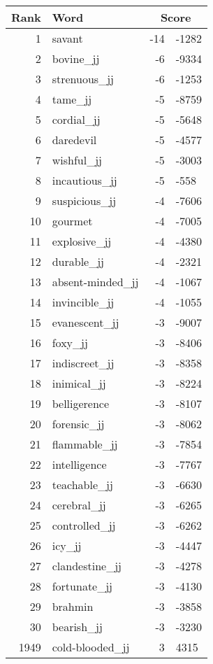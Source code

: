 \begin{longtable}[!htbp]{| rlr@{.}l |}
    \hline
    \textbf{Rank} & \textbf{Word} & \multicolumn{2}{c|}{\textbf{Score}} \\
    \hline
    \endhead
    1 & savant & -14 & -1282 \\
    2 & bovine\_jj & -6 & -9334 \\
    3 & strenuous\_jj & -6 & -1253 \\
    4 & tame\_jj & -5 & -8759 \\
    5 & cordial\_jj & -5 & -5648 \\
    6 & daredevil & -5 & -4577 \\
    7 & wishful\_jj & -5 & -3003 \\
    8 & incautious\_jj & -5 & -558 \\
    9 & suspicious\_jj & -4 & -7606 \\
    10 & gourmet & -4 & -7005 \\
    11 & explosive\_jj & -4 & -4380 \\
    12 & durable\_jj & -4 & -2321 \\
    13 & absent-minded\_jj & -4 & -1067 \\
    14 & invincible\_jj & -4 & -1055 \\
    15 & evanescent\_jj & -3 & -9007 \\
    16 & foxy\_jj & -3 & -8406 \\
    17 & indiscreet\_jj & -3 & -8358 \\
    18 & inimical\_jj & -3 & -8224 \\
    19 & belligerence & -3 & -8107 \\
    20 & forensic\_jj & -3 & -8062 \\
    21 & flammable\_jj & -3 & -7854 \\
    22 & intelligence & -3 & -7767 \\
    23 & teachable\_jj & -3 & -6630 \\
    24 & cerebral\_jj & -3 & -6265 \\
    25 & controlled\_jj & -3 & -6262 \\
    26 & icy\_jj & -3 & -4447 \\
    27 & clandestine\_jj & -3 & -4278 \\
    28 & fortunate\_jj & -3 & -4130 \\
    29 & brahmin & -3 & -3858 \\
    30 & bearish\_jj & -3 & -3230 \\
    1949 & cold-blooded\_jj & 3 & 4315 \\

\end{longtable}
